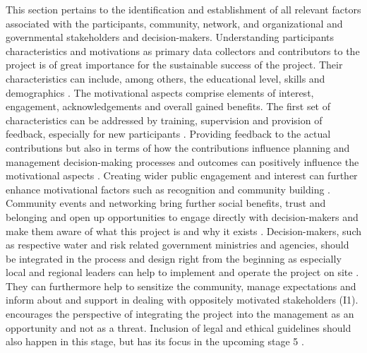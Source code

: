 This section pertains to the identification and establishment of all relevant factors associated with the participants, community, network, and organizational and governmental stakeholders and decision-makers. Understanding participants characteristics and motivations as primary data collectors and contributors to the project is of great importance for the sustainable success of the project. Their characteristics can include, among others, the educational level, skills and demographics \autocite{cervoniImplementingIntegratedWater2008,fraislCitizenScienceEnvironmental2022}. The motivational aspects comprise elements of interest, engagement, acknowledgements and overall gained benefits. The first set of characteristics can be addressed by training, supervision and provision of feedback, especially for new participants \autocite{escaeuropeancitizenscienceassociationTenPrinciplesCitizen2015,fraislCitizenScienceEnvironmental2022,minkmanCitizenScienceWater2015,sharpeCommunityBasedEcological2006}. Providing feedback to the actual contributions but also in terms of how the contributions influence planning and management decision-making processes and outcomes can positively influence the motivational aspects \autocite{conradMeaningfulCommunityBasedEcological2006,conradReviewCitizenScience2011,whitelawEstablishingCanadianCommunity2003}. Creating wider public engagement and interest can further enhance motivational factors such as recognition and community building \autocite{conradMeaningfulCommunityBasedEcological2006}. Community events and networking bring further social benefits, trust and belonging and open up opportunities to engage directly with decision-makers and make them aware of what this project is and why it exists \autocite{conradMeaningfulCommunityBasedEcological2006,fraislCitizenScienceEnvironmental2022,sharpeCommunityBasedEcological2006}. Decision-makers, such as respective water and risk related government ministries and agencies, should be integrated in the process and design right from the beginning as especially local and regional leaders can help to implement and operate the project on site \autocite{gualazziniEWEAEarlyWarning2021,ifrcCommunityBasedSurveillanceGuiding2017}. They can furthermore help to sensitize the community, manage expectations and inform about and support in dealing with oppositely motivated stakeholders (I1). \autocite{conradMeaningfulCommunityBasedEcological2006} encourages the perspective of integrating the project into the management as an opportunity and not as a threat. Inclusion of legal and ethical guidelines should also happen in this stage, but has its focus in the upcoming stage 5 \autocite{fraislCitizenScienceEnvironmental2022, ifrcCommunityBasedSurveillanceGuiding2017,minkmanCitizenScienceWater2015}.

